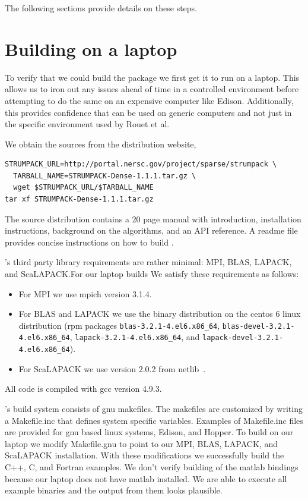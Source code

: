 \documentclass{acmsmall}
\begin{document}
The following sections provide details on these steps.


\section{Building \strumpack{} on a laptop}

To verify that we could build the package we first get it to run
on a laptop.  This allows us to iron out any issues ahead of time
in a controlled environment before attempting to do the same on
an expensive computer like Edison.  Additionally, this provides
confidence that \strumpack{} can be used on generic computers and
not just in the specific environment used by Rouet et al.

We obtain the sources from the \strumpack{} distribution website,
\begin{verbatim}
STRUMPACK_URL=http://portal.nersc.gov/project/sparse/strumpack \
  TARBALL_NAME=STRUMPACK-Dense-1.1.1.tar.gz \
  wget $STRUMPACK_URL/$TARBALL_NAME
tar xf STRUMPACK-Dense-1.1.1.tar.gz
\end{verbatim}

The source distribution contains a 20 page manual with
introduction, installation instructions, background on the
algorithms, and an API reference.  A readme file
provides concise instructions on how to build \strumpack{}.

\strumpack{}'s third party library requirements are rather
minimal: MPI, BLAS, LAPACK, and ScaLAPACK.\@ For our laptop
builds We satisfy these requirements as follows:
\begin{itemize}
\item For MPI we use mpich version 3.1.4.
\item For BLAS and LAPACK we use the binary distribution on
the centos 6 linux distribution (rpm packages
\verb!blas-3.2.1-4.el6.x86_64!,
\verb!blas-devel-3.2.1-4.el6.x86_64!,
\verb!lapack-3.2.1-4.el6.x86_64!, and
\verb!lapack-devel-3.2.1-4.el6.x86_64!).
\item For ScaLAPACK we use version 2.0.2 from netlib~\cite{netlib}.
\end{itemize}
All code is compiled with gcc version 4.9.3.

\strumpack{}'s build system consists of gnu makefiles.  The
makefiles are customized by writing a Makefile.inc that defines
system specific variables.  Examples of Makefile.inc files are
provided for gnu based linux systems, Edison, and Hopper.  To
build on our laptop we modify Makefile.gnu to point to our MPI,
BLAS, LAPACK, and ScaLAPACK installation.  With these
modifications we successfully build the C++, C, and Fortran
examples.  We don't verify building of the matlab bindings
because our laptop does not have matlab installed.  We are able
to execute all example binaries and the output from them looks
plausible.
\end{document}
